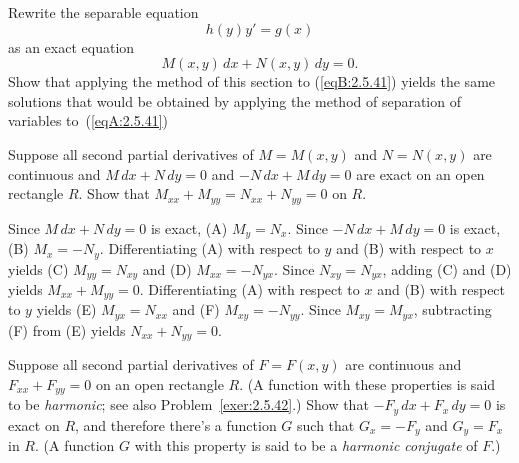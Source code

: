 \documentclass{ximera}
\begin{document}
\begin{problem}\label{exer:2.5.41}
Rewrite the separable equation
\begin{equation}\label{eqA:2.5.41}
h(y)y'=g(x)
\end{equation}
as an exact equation
\begin{equation}\label{eqB:2.5.41}
M(x,y)\,dx+N(x,y)\,dy=0.
\end{equation}
Show that applying the method of this section  to
(\ref{eqB:2.5.41}) yields the same solutions that would be
obtained by applying the method of separation of variables
to~(\ref{eqA:2.5.41})
\end{problem}

\begin{problem}\label{exer:2.5.42}
Suppose  all second partial derivatives of $M=M(x,y)$ and $N=N(x,y)$
are continuous and $M\,dx+N\,dy=0$ and $-N\,dx+M\,dy=0$ are
exact on an open rectangle  $R$.  Show that
$M_{xx}+M_{yy}=N_{xx}+N_{yy}=0$ on
$R$.



\begin{solution}
    Since $M\,dx+N\,dy=0$ is exact,  (A) $M_y=N_x$.
Since $-N\,dx+M\,dy=0$ is exact,  (B) $M_x=-N_y$.
Differentiating (A) with respect to $y$ and (B) with respect to
$x$ yields (C) $M_{yy}=N_{xy}$ and (D) $M_{xx}=-N_{yx}$.
Since $N_{xy}=N_{yx}$, adding (C) and (D) yields $M_{xx}+M_{yy}=0$.
Differentiating (A) with respect to $x$ and (B) with respect to
$y$ yields (E) $M_{yx}=N_{xx}$ and (F) $M_{xy}=-N_{yy}$.
Since $M_{xy}=M_{yx}$, subtracting (F) from (E) yields
$N_{xx}+N_{yy}=0$.
\end{solution}
\end{problem}

\begin{problem}\label{exer:2.5.43} Suppose all second partial derivatives of
$F=F(x,y)$ are continuous and $F_{xx}+F_{yy}=0$ on an open rectangle
$R$. (A function with these properties is said to be \emph{harmonic};
see also Problem~\ref{exer:2.5.42}.) Show that $-F_y\,dx+F_x\,dy=0$ is
exact on $R$, and
therefore there's a function $G$ such that
$G_x=-F_y$ and $G_y=F_x$ in $R$. (A function $G$ with this property is
said to be a \emph{harmonic conjugate} of $F$.)
\end{problem}
\end{document}
